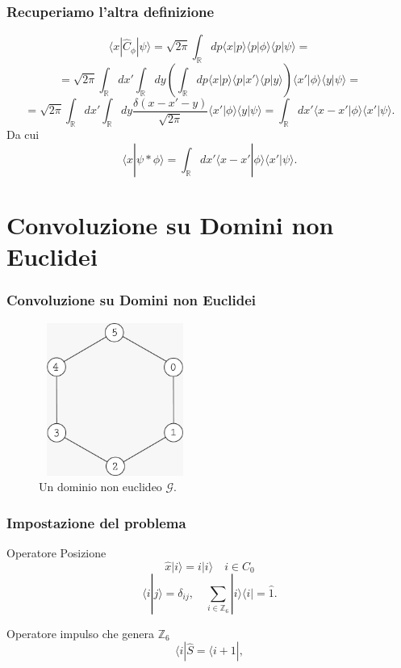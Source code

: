 \documentclass[xcolor=dvipsnames]{beamer}
\newcommand{\R}{\mathbb{R}}
\newcommand{\Z}{\mathbb{Z}}
\newcommand{\mc}[1]{\mathcal{#1}}
\begin{document}
\begin{frame}
    \frametitle{Recuperiamo l'altra definizione}
     \[ \langle x | \widehat{C}_\phi | \psi \rangle = \sqrt{2\pi} \int_\R dp \langle x | p \rangle \langle p | \phi \rangle \langle p | \psi \rangle = \] \[
      = \sqrt{2\pi} \int_\R dx' \int_\R dy \left( \int_\R dp \langle x | p \rangle \langle p | x' \rangle \langle p | y \rangle \right) \langle x' | \phi \rangle 
     \langle y | \psi \rangle = \] \[ =  \sqrt{2\pi} \int_\R dx' \int_\R dy \frac{\delta(x - x' - y)}{\sqrt{2\pi}} \langle x' | \phi \rangle \langle y | \psi \rangle = 
     \int_\R dx' \langle x - x' | \phi \rangle \langle x' | \psi \rangle . \]
     Da cui
     {\color{blue}\[ \langle x | \psi * \phi \rangle = \int_\R dx' \langle x - x' | \phi \rangle \langle x' | \psi \rangle. \] }  
\end{frame}

\section{Convoluzione su Domini \textbf{non} Euclidei}

\begin{frame}
    \frametitle{Convoluzione su Domini non Euclidei}
    \begin{figure}[H]
        \centering
        \includegraphics[width=5cm, height=5cm]{graph}
        \caption{Un dominio non euclideo $\mc{G}$.}
    \end{figure}    
\end{frame}

\begin{frame}
    \frametitle{Impostazione del problema}
    \begin{block}{Operatore Posizione}
        \[ \widehat{x}|i\rangle = i | i \rangle \quad i \in C_0 \]
        \[ \langle i | j \rangle = \delta_{ij}, \quad
    \sum_{i \in \Z_6} | i \rangle \langle i | = \widehat{1} .\]
    \end{block}
    \begin{block}{Operatore impulso che genera $\Z_6$}
    \[  \langle i | \widehat{S}  = \langle i+1 |, \]
    \end{block}
\end{frame}
\end{document}
